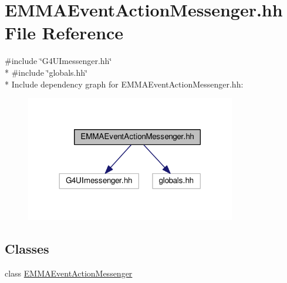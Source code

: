 \hypertarget{EMMAEventActionMessenger_8hh}{}\section{E\+M\+M\+A\+Event\+Action\+Messenger.\+hh File Reference}
\label{EMMAEventActionMessenger_8hh}
{\ttfamily \#include \char`\"{}G4\+U\+Imessenger.\+hh\char`\"{}}\\*
{\ttfamily \#include \char`\"{}globals.\+hh\char`\"{}}\\*
Include dependency graph for E\+M\+M\+A\+Event\+Action\+Messenger.\+hh\+:
\nopagebreak
\begin{figure}[H]
\begin{center}
\leavevmode
\includegraphics[width=260pt]{EMMAEventActionMessenger_8hh__incl}
\end{center}
\end{figure}
\subsection*{Classes}
\begin{DoxyCompactItemize}
\item 
class \hyperlink{classEMMAEventActionMessenger}{E\+M\+M\+A\+Event\+Action\+Messenger}
\end{DoxyCompactItemize}
